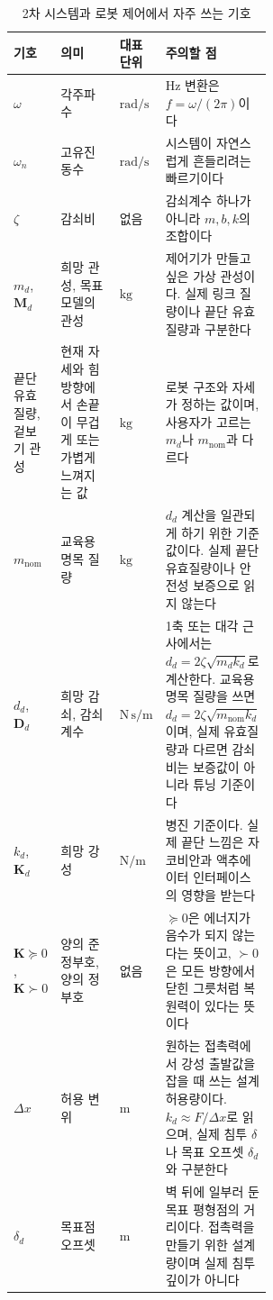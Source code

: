 \begin{table}[H]
  \centering
  \caption{2차 시스템과 로봇 제어에서 자주 쓰는 기호}
  \small
  \setlength{\tabcolsep}{4pt}
  \begin{tabularx}{\linewidth}{@{}>{\raggedright\arraybackslash}p{0.16\linewidth}>{\raggedright\arraybackslash}p{0.26\linewidth}>{\raggedright\arraybackslash}p{0.15\linewidth}>{\raggedright\arraybackslash}X@{}}
    \toprule
    기호 & 의미 & 대표 단위 & 주의할 점 \\
    \midrule
    $\omega$ & 각주파수 & $\mathrm{rad/s}$ & Hz 변환은 $f=\omega/(2\pi)$이다 \\
    $\omega_n$ & 고유진동수 & $\mathrm{rad/s}$ & 시스템이 자연스럽게 흔들리려는 빠르기이다 \\
    $\zeta$ & 감쇠비 & 없음 & 감쇠계수 하나가 아니라 $m,b,k$의 조합이다 \\
    $m_d$, $\bm{M}_d$ & 희망 관성, 목표 모델의 관성 & $\mathrm{kg}$ & 제어기가 만들고 싶은 가상 관성이다. 실제 링크 질량이나 끝단 유효질량과 구분한다 \\
    끝단 유효질량, 겉보기 관성 & 현재 자세와 힘 방향에서 손끝이 무겁게 또는 가볍게 느껴지는 값 & $\mathrm{kg}$ & 로봇 구조와 자세가 정하는 값이며, 사용자가 고르는 $m_d$나 $m_{\mathrm{nom}}$과 다르다 \\
    $m_{\mathrm{nom}}$ & 교육용 명목 질량 & $\mathrm{kg}$ & $d_d$ 계산을 일관되게 하기 위한 기준값이다. 실제 끝단 유효질량이나 안전성 보증으로 읽지 않는다 \\
    $d_d$, $\bm{D}_d$ & 희망 감쇠, 감쇠계수 & $\mathrm{N\,s/m}$ & 1축 또는 대각 근사에서는 $d_d=2\zeta\sqrt{m_dk_d}$로 계산한다. 교육용 명목 질량을 쓰면 $d_d=2\zeta\sqrt{m_{\mathrm{nom}}k_d}$이며, 실제 유효질량과 다르면 감쇠비는 보증값이 아니라 튜닝 기준이다 \\
    $k_d$, $\bm{K}_d$ & 희망 강성 & $\mathrm{N/m}$ & 병진 기준이다. 실제 끝단 느낌은 자코비안과 액추에이터 인터페이스의 영향을 받는다 \\
    $\bm{K}\succeq0$, $\bm{K}\succ0$ & 양의 준정부호, 양의 정부호 & 없음 & $\succeq0$은 에너지가 음수가 되지 않는다는 뜻이고, $\succ0$은 모든 방향에서 닫힌 그릇처럼 복원력이 있다는 뜻이다 \\
    $\Delta x$ & 허용 변위 & $\mathrm{m}$ & 원하는 접촉력에서 강성 출발값을 잡을 때 쓰는 설계 허용량이다. $k_d\approx F/\Delta x$로 읽으며, 실제 침투 $\delta$나 목표 오프셋 $\delta_d$와 구분한다 \\
    $\delta_d$ & 목표점 오프셋 & $\mathrm{m}$ & 벽 뒤에 일부러 둔 목표 평형점의 거리이다. 접촉력을 만들기 위한 설계량이며 실제 침투 깊이가 아니다 \\

\end{tabularx}
\end{table}

